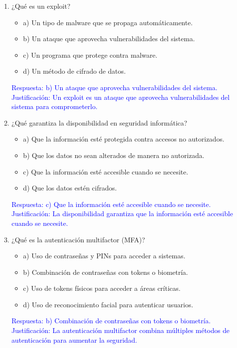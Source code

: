\documentclass[a4paper]{article}
\begin{document}
\begin{enumerate}
    \item ¿Qué es un exploit?
    \begin{itemize}
        \item a) Un tipo de malware que se propaga automáticamente.
        \item b) Un ataque que aprovecha vulnerabilidades del sistema.
        \item c) Un programa que protege contra malware.
        \item d) Un método de cifrado de datos.
    \end{itemize}
    \textcolor{blue}{Respuesta: b) Un ataque que aprovecha vulnerabilidades del sistema. Justificación: Un exploit es un ataque que aprovecha vulnerabilidades del sistema para comprometerlo.}
    \vspace{1cm}
    
    \item ¿Qué garantiza la disponibilidad en seguridad informática?
    \begin{itemize}
        \item a) Que la información esté protegida contra accesos no autorizados.
        \item b) Que los datos no sean alterados de manera no autorizada.
        \item c) Que la información esté accesible cuando se necesite.
        \item d) Que los datos estén cifrados.
    \end{itemize}
    \textcolor{blue}{Respuesta: c) Que la información esté accesible cuando se necesite. Justificación: La disponibilidad garantiza que la información esté accesible cuando se necesite.}
    \vspace{1cm}
    
    \item ¿Qué es la autenticación multifactor (MFA)?
    \begin{itemize}
        \item a) Uso de contraseñas y PINs para acceder a sistemas.
        \item b) Combinación de contraseñas con tokens o biometría.
        \item c) Uso de tokens físicos para acceder a áreas críticas.
        \item d) Uso de reconocimiento facial para autenticar usuarios.
    \end{itemize}
    \textcolor{blue}{Respuesta: b) Combinación de contraseñas con tokens o biometría. Justificación: La autenticación multifactor combina múltiples métodos de autenticación para aumentar la seguridad.}
    \vspace{1cm}
    

\end{enumerate}
\end{document}
